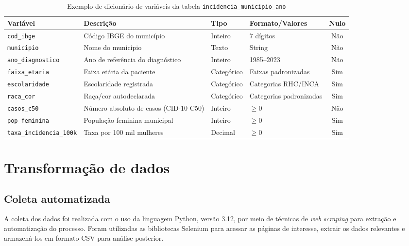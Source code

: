 \begin{table}[htbp]
\centering
\caption{Exemplo de dicionário de variáveis da tabela \texttt{incidencia\_municipio\_ano}}
\label{tab:exemplo_dicionario_variaveis}
\small
\begin{tabular}{|l|p{4.8cm}|l|p{3.5cm}|c|}
\hline
\textbf{Variável} & \textbf{Descrição} & \textbf{Tipo} & \textbf{Formato/Valores} & \textbf{Nulo} \\
\hline
\texttt{cod\_ibge} & Código IBGE do município & Inteiro & 7 dígitos & Não \\
\hline
\texttt{municipio} & Nome do município & Texto & String & Não \\
\hline
\texttt{ano\_diagnostico} & Ano de referência do diagnóstico & Inteiro & 1985--2023 & Não \\
\hline
\texttt{faixa\_etaria} & Faixa etária da paciente & Categórico & Faixas padronizadas & Sim \\
\hline
\texttt{escolaridade} & Escolaridade registrada & Categórico & Categorias RHC/INCA & Sim \\
\hline
\texttt{raca\_cor} & Raça/cor autodeclarada & Categórico & Categorias padronizadas & Sim \\
\hline
\texttt{casos\_c50} & Número absoluto de casos (CID-10 C50) & Inteiro & $\geq 0$ & Não \\
\hline
\texttt{pop\_feminina} & População feminina municipal & Inteiro & $\geq 0$ & Sim \\
\hline
\texttt{taxa\_incidencia\_100k} & Taxa por 100 mil mulheres & Decimal & $\geq 0$ & Sim \\
\hline
\end{tabular}
\end{table}

\section{Transformação de dados}

\subsection{Coleta automatizada}

A coleta dos dados foi realizada com o uso da linguagem Python, versão 3.12, por meio de técnicas de \textit{web scraping} para extração e automatização do processo. Foram utilizadas as bibliotecas Selenium para acessar as páginas de interesse, extrair os dados relevantes e armazená-los em formato CSV para análise posterior.

